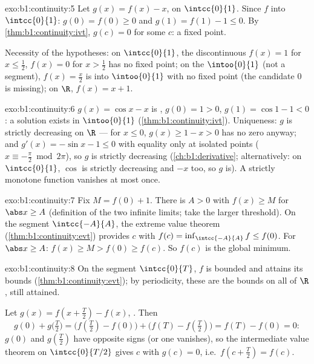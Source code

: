 \begin{solution}{exo:b1:continuity:5}
Let $g(x) = f(x) - x$,  on $\intcc{0}{1}$. Since $f$ 
into $\intcc{0}{1}$: $g(0) = f(0) \geq 0$ and $g(1) = f(1) - 1 \leq
0$. By \cref{thm:b1:continuity:ivt}, $g(c) = 0$ for some $c$: a
fixed point.

Necessity of the hypotheses: on $\intcc{0}{1}$, the discontinuous 
$f(x) = 1$ for $x \leq \frac12$, $f(x) = 0$ for $x > \frac12$ has no
fixed point; on the  $\intoo{0}{1}$ (not a segment), $f(x) =
\frac x2$ is  into $\intoo{0}{1}$ with no fixed point
(the candidate $0$ is missing); on $\R$, $f(x) = x + 1$.
\end{solution}

\begin{solution}{exo:b1:continuity:6}
$g(x) = \cos x - x$ is , $g(0) = 1 > 0$, $g(1) = \cos 1 -
1 < 0$: a solution exists in $\intoo{0}{1}$
(\cref{thm:b1:continuity:ivt}). Uniqueness: $g$ is strictly
decreasing on $\R$ --- for $x \leq 0$, $g(x) \geq 1 - x > 0$ has no
zero anyway; and $g'(x) = -\sin x - 1 \leq 0$ with equality only at
isolated points ($x \equiv -\frac\pi2 \bmod 2\pi$), so $g$ is
strictly decreasing (\cref{ch:b1:derivative}; alternatively: on
$\intcc{0}{1}$, $\cos$ is strictly decreasing and $-x$ too, so $g$
is). A strictly monotone function vanishes at most once.
\end{solution}

\begin{solution}{exo:b1:continuity:7}
Fix $M = f(0) + 1$. There is $A > 0$ with $f(x) \geq M$ for $\abs x
\geq A$ (definition of the two infinite limits; take the larger
threshold). On the segment $\intcc{-A}{A}$, the extreme value theorem
(\cref{thm:b1:continuity:evt}) provides $c$ with $f(c) =
\inf_{\intcc{-A}{A}} f \leq f(0)$. For $\abs x \geq A$: $f(x) \geq M
> f(0) \geq f(c)$. So $f(c)$ is the global minimum.
\end{solution}

\begin{solution}{exo:b1:continuity:8}
On the segment $\intcc{0}{T}$, $f$ is bounded and attains its bounds
(\cref{thm:b1:continuity:evt}); by periodicity, these are the bounds
on all of $\R$, still attained.

Let $g(x) = f(x + \frac T2) - f(x)$, . Then
\[
g(0) + g\bigl(\tfrac T2\bigr)
= \bigl(f(\tfrac T2) - f(0)\bigr) + \bigl(f(T) - f(\tfrac T2)\bigr)
= f(T) - f(0) = 0 :
\]
$g(0)$ and $g(\frac T2)$ have opposite signs (or one vanishes), so
the intermediate value theorem on $\intcc{0}{T/2}$ gives $c$ with
$g(c) = 0$, i.e.\ $f(c + \frac T2) = f(c)$.
\end{solution}

